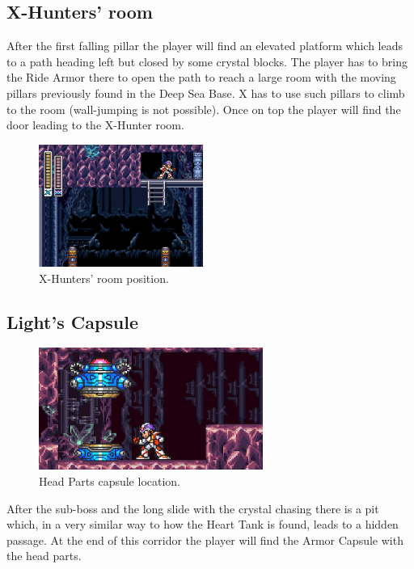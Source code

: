 \subsection{X-Hunters' room}
After the first falling pillar the player will find an elevated platform which leads to a path heading left but closed by some crystal blocks. The player has to bring the Ride Armor there to open the path to reach a large room with the moving pillars previously found in the Deep Sea Base. X has to use such pillars to climb to the room (wall-jumping is not possible). Once on top the player will find the door leading to the X-Hunter room.
\begin{figure}[htp]
	\centering
	\includegraphics[height=4cm]{figures/X2/Crystal_snail/Crystal_hunter_room.png}
	\caption{X-Hunters' room position.}
\end{figure}

\subsection{Light's Capsule}\label{X2:Head_parts}
\begin{figure}[htp]
	\centering
	\includegraphics[height=4cm]{figures/X2/Crystal_snail/Crystal_capsule.jpg}
	\caption{Head Parts capsule location.}
\end{figure}
After the sub-boss and the long slide with the crystal chasing there is a pit which, in a very similar way to how the Heart Tank is found, leads to a hidden passage. At the end of this corridor the player will find the Armor Capsule with the head parts.



